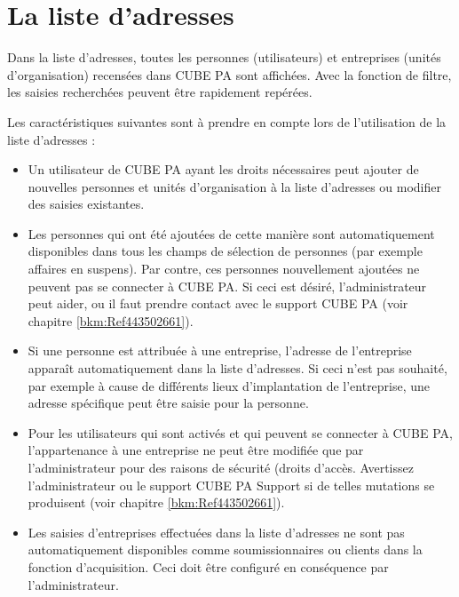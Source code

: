 
\clearpage
\section{La liste d'adresses}
\label{bkm:Ref443738751}
Dans la liste d'adresses, toutes les personnes (utilisateurs) et entreprises (unités d'organisation) recensées dans CUBE PA sont affichées. Avec la fonction de filtre, les saisies recherchées peuvent être rapidement repérées.

\vspace{\baselineskip}

Les caractéristiques suivantes sont à prendre en compte lors de l'utilisation de la liste d'adresses :

\begin{itemize}
\item
Un utilisateur de CUBE PA ayant les droits nécessaires peut ajouter de nouvelles personnes et unités d'organisation à la liste d'adresses ou modifier des saisies existantes.

\item
Les personnes qui ont été ajoutées de cette manière sont automatiquement disponibles dans tous les champs de sélection de personnes (par exemple affaires en suspens). Par contre, ces personnes nouvellement ajoutées ne peuvent pas se connecter à CUBE PA. Si ceci est désiré, l'administrateur peut aider, ou il faut prendre contact avec le support CUBE PA 
(voir chapitre \ref{bkm:Ref443502661}).

\item
Si une personne est attribuée à une entreprise, l'adresse de l'entreprise apparaît automatiquement dans la liste d'adresses. Si ceci n'est pas souhaité, par exemple à cause de différents lieux d'implantation de l'entreprise, 
une adresse spécifique peut être saisie pour la personne.

\item
Pour les utilisateurs qui sont activés et qui peuvent se connecter à CUBE PA, l'appartenance à une entreprise ne peut être modifiée que par l'administrateur pour des raisons de sécurité (droits d'accès. Avertissez l'administrateur ou le support CUBE PA Support si de telles mutations se produisent (voir chapitre \ref{bkm:Ref443502661}).

\item
Les saisies d'entreprises effectuées dans la liste d'adresses ne sont pas automatiquement disponibles comme soumissionnaires ou clients dans la fonction d'acquisition. Ceci doit être configuré en conséquence par l'administrateur.
\end{itemize}

